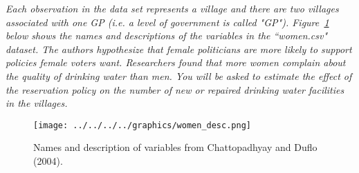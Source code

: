 \documentclass[12pt,letterpaper]{article}
\begin{document}
\noindent \textit{Each observation in the data set represents a village and there are two villages associated with one GP (i.e. a level of government is called "GP"). Figure~\ref{fig:women_desc} below shows the names and descriptions of the variables in the ``women.csv" dataset. The authors hypothesize that female politicians are more likely to support policies female voters want. Researchers found that more women complain about the quality of drinking water than men. You will be asked to estimate the effect of the reservation policy on the number of new or repaired drinking water facilities in the villages.}
\vspace{.5cm}
\begin{figure}[h!]
	\caption{\footnotesize{Names and description of variables from Chattopadhyay and Duflo (2004).}}
	\centering
	\label{fig:women_desc}
	\texttt{[image: ../../../../graphics/women\_desc.png]}
\end{figure}		
\newpage
\end{document}
